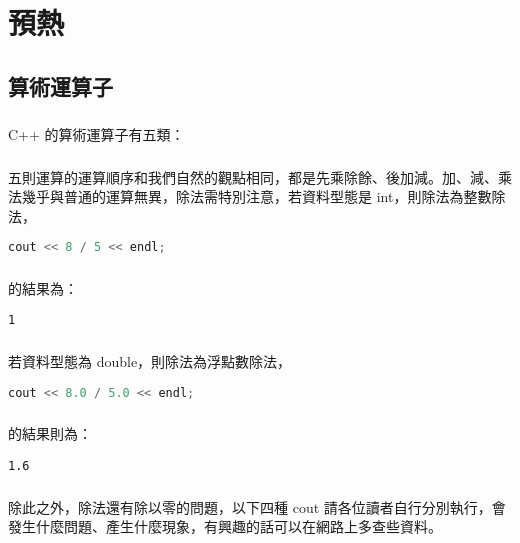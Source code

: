 \chapter{預熱}

\section{算術運算子}

\paragraph{}C++ 的算術運算子有五類：
\paragraph{}五則運算的運算順序和我們自然的觀點相同，都是先乘除餘、後加減。加、減、乘法幾乎與普通的運算無異，除法需特別注意，若資料型態是 int，則除法為整數除法，
\begin{lstlisting}[language=C++]
cout << 8 / 5 << endl;
\end{lstlisting}
\paragraph{}的結果為：
\begin{lstlisting}
1
\end{lstlisting}
\paragraph{}若資料型態為 double，則除法為浮點數除法，
\begin{lstlisting}[language=C++]
cout << 8.0 / 5.0 << endl;
\end{lstlisting}
\paragraph{}的結果則為：
\begin{lstlisting}
1.6
\end{lstlisting}
\paragraph{}除此之外，除法還有除以零的問題，以下四種 cout 請各位讀者自行分別執行，會發生什麼問題、產生什麼現象，有興趣的話可以在網路上多查些資料。